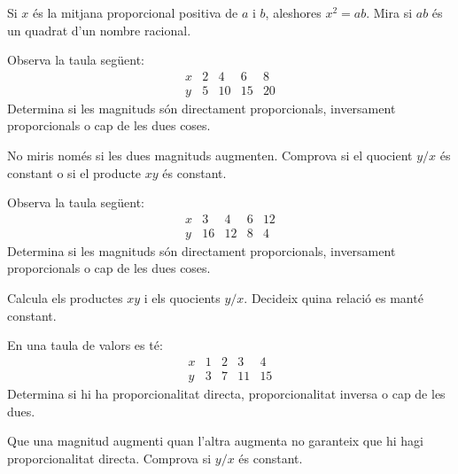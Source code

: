 \begin{indicacio}
	Si \(x\) és la mitjana proporcional positiva de \(a\) i \(b\), aleshores \(x^2=ab\). Mira si \(ab\) és un quadrat d'un nombre racional.
\end{indicacio}

\begin{exercici}
	Observa la taula següent:
	\[
	\begin{array}{c|cccc}
	x & 2 & 4 & 6 & 8 \\
	\hline
	y & 5 & 10 & 15 & 20
	\end{array}
	\]
	Determina si les magnituds són directament proporcionals, inversament proporcionals o cap de les dues coses.
\end{exercici}

\begin{indicacio}
	No miris només si les dues magnituds augmenten. Comprova si el quocient \(y/x\) és constant o si el producte \(xy\) és constant.
\end{indicacio}

\begin{exercici}
	Observa la taula següent:
	\[
	\begin{array}{c|cccc}
	x & 3 & 4 & 6 & 12 \\
	\hline
	y & 16 & 12 & 8 & 4
	\end{array}
	\]
	Determina si les magnituds són directament proporcionals, inversament proporcionals o cap de les dues coses.
\end{exercici}

\begin{indicacio}
	Calcula els productes \(xy\) i els quocients \(y/x\). Decideix quina relació es manté constant.
\end{indicacio}

\begin{exercici}
	En una taula de valors es té:
	\[
	\begin{array}{c|cccc}
	x & 1 & 2 & 3 & 4 \\
	\hline
	y & 3 & 7 & 11 & 15
	\end{array}
	\]
	Determina si hi ha proporcionalitat directa, proporcionalitat inversa o cap de les dues.
\end{exercici}

\begin{indicacio}
	Que una magnitud augmenti quan l'altra augmenta no garanteix que hi hagi proporcionalitat directa. Comprova si \(y/x\) és constant.
\end{indicacio}

